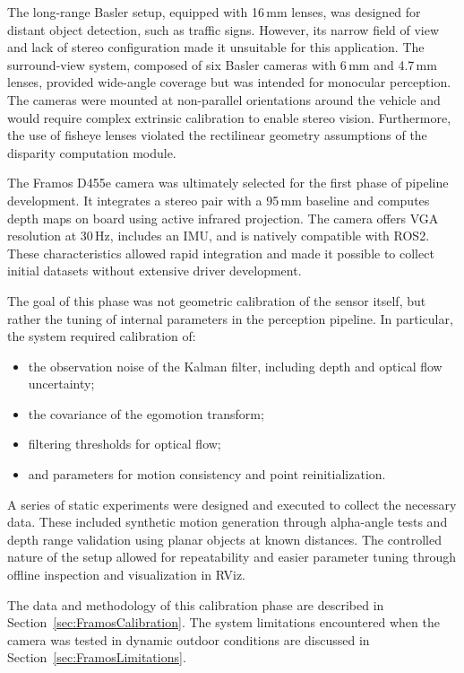 The long-range Basler setup, equipped with 16\,mm lenses, was designed 
for distant object detection, such as traffic signs. However, its narrow 
field of view and lack of stereo configuration made it unsuitable for this 
application. The surround-view system, composed of six Basler cameras 
with 6\,mm and 4.7\,mm lenses, provided wide-angle coverage but was 
intended for monocular perception. The cameras were mounted at 
non-parallel orientations around the vehicle and would require complex 
extrinsic calibration to enable stereo vision. Furthermore, the use of 
fisheye lenses violated the rectilinear geometry assumptions of the 
disparity computation module.

The Framos D455e camera was ultimately selected for the first phase of 
pipeline development. It integrates a stereo pair with a 95\,mm baseline 
and computes depth maps on board using active infrared projection. The 
camera offers VGA resolution at 30\,Hz, includes an IMU, and is 
natively compatible with ROS2. These characteristics allowed rapid 
integration and made it possible to collect initial datasets without 
extensive driver development.

The goal of this phase was not geometric calibration of the sensor 
itself, but rather the tuning of internal parameters in the perception 
pipeline. In particular, the system required calibration of:
\begin{itemize}
  \item the observation noise of the Kalman filter, including depth and 
        optical flow uncertainty;
  \item the covariance of the egomotion transform;
  \item filtering thresholds for optical flow;
  \item and parameters for motion consistency and point reinitialization.
\end{itemize}

A series of static experiments were designed and executed to collect 
the necessary data. These included synthetic motion generation 
through alpha-angle tests and depth range validation using planar 
objects at known distances. The controlled nature of the setup 
allowed for repeatability and easier parameter tuning through offline 
inspection and visualization in RViz.

The data and methodology of this calibration phase are described in 
Section~\ref{sec:FramosCalibration}. The system limitations 
encountered when the camera was tested in dynamic outdoor 
conditions are discussed in Section~\ref{sec:FramosLimitations}.


